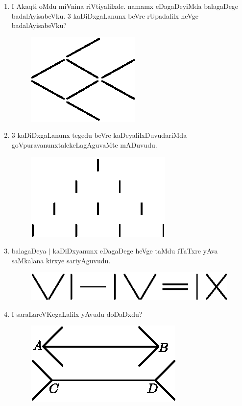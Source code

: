 \begin{enumerate}
\item I Akaqti oMdu miVnina riVtiyalilxde. namamx eDagaDeyiMda balagaDege badalAyisabeVku. $3$ kaDiDxgaLanunx beVre rUpadalilx heVge badalAyisabeVku?
\begin{figure}[H]
\centering
\includegraphics{src/figures/exr41.eps}
\end{figure}

\item $3$ kaDiDxgaLanunx tegedu beVre kaDeyalilxDuvudariMda goVpuravanunx\break talekeLagAguvaMte mADuvudu.
\begin{figure}[H]
\centering
\includegraphics{src/figures/exr42.eps}
\end{figure}

\item balagaDeya $|$ kaDiDxyanunx eDagaDege heVge taMdu iTaTxre yAva saMkalana kirxye sariyAguvudu.
\begin{figure}[H]
\centering
\includegraphics{src/figures/exr43.eps}
\end{figure}

\item I saraLareVKegaLalilx yAvudu doDaDxdu?
\begin{figure}[H]
\centering
\includegraphics{src/figures/exr44.eps}
\end{figure}


\end{enumerate}
